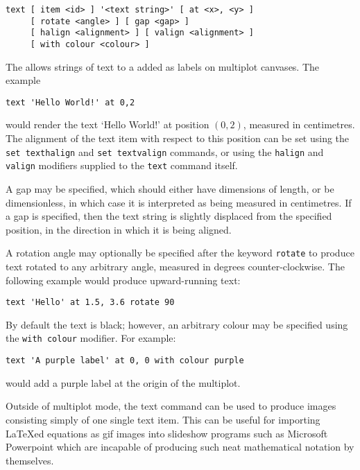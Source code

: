 \begin{verbatim}
text [ item <id> ] '<text string>' [ at <x>, <y> ]
     [ rotate <angle> ] [ gap <gap> ]
     [ halign <alignment> ] [ valign <alignment> ]
     [ with colour <colour> ]
\end{verbatim}

The  allows strings of text to a added as labels on multiplot
canvases. The example

\begin{verbatim}
text 'Hello World!' at 0,2
\end{verbatim}

\noindent would render the text `Hello World!' at position $(0,2)$, measured in
centimetres. The alignment of the text item with respect to this position can
be set using the {\tt set texthalign} and {\tt set textvalign} commands, or
using the {\tt halign} and {\tt valign} modifiers supplied to the {\tt text}
command itself.

A gap may be specified, which should either have dimensions of length, or be
dimensionless, in which case it is interpreted as being measured in
centimetres. If a gap is specified, then the text string is slightly displaced
from the specified position, in the direction in which it is being aligned.

A rotation angle may optionally be specified after the keyword {\tt rotate}
to produce text rotated to any arbitrary angle, measured in degrees
counter-clockwise. The following example would produce upward-running text:

\begin{verbatim}
text 'Hello' at 1.5, 3.6 rotate 90
\end{verbatim}

By default the text is black; however, an arbitrary colour may be specified
using the {\tt with colour} modifier.  For example:

\begin{verbatim}
text 'A purple label' at 0, 0 with colour purple
\end{verbatim}

\noindent would add a purple label at the origin of the multiplot.

Outside of multiplot mode, the text command can be used to produce images
consisting simply of one single text item. This can be useful for importing
\LaTeX ed equations as gif images into slideshow programs such as Microsoft
Powerpoint which are incapable of producing such neat mathematical notation
by themselves.

